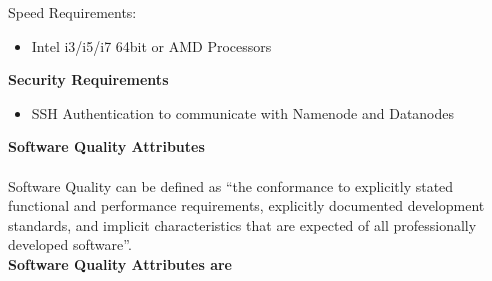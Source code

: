 \documentclass[oneside,a4paper,12pt]{report}
\begin{document}
Speed Requirements:
\begin{itemize}
\item Intel i3/i5/i7 64bit or AMD Processors
\end{itemize}

\textbf{Security Requirements}
\begin{itemize}
\item SSH Authentication to communicate with Namenode and Datanodes
\end{itemize}

\textbf{Software Quality Attributes}

\paragraph{}
Software Quality can be defined as “the conformance to explicitly stated functional and performance requirements, explicitly documented development standards, and implicit characteristics that are expected of all professionally developed software”.\\
	
\textbf{Software Quality Attributes are}
\end{document}
